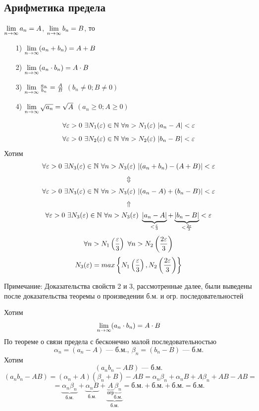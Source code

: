 \subsection{Арифметика предела}
$ \lim\limits_{n \to \infty}a_n = A $, $ \lim\limits_{n \to \infty}b_n = B $, то

\begin{itemize}
    \item[1)] $\lim\limits_{n \to \infty}(a_n + b_n) = A + B$
    \item[2)] $\lim\limits_{n \to \infty}(a_n \cdot b_n) = A \cdot B$
    \item[3)] $\lim\limits_{n \to \infty}\frac{a_n}{b_n} = \frac{A}{B}$ $(b_n \neq 0; B \neq 0)$
    \item[4)] $\lim\limits_{n \to \infty}\sqrt{a_n} = \sqrt{A}$ $(a_n \geq 0; A \geq 0)$
\end{itemize}

\begin{Proof}
    $$ \forall \varepsilon > 0\ \exists N_1(\varepsilon) \in \mathbb{N}\ \forall n > N_1(\varepsilon)\ |a_n - A| < \varepsilon $$
    $$ \forall \eps > 0\ \exists N_2(\eps) \in \N\ \forall n > N_2(\eps)\ |b_n - B| < \eps $$
    Хотим
    $$ \forall \eps > 0\ \exists N_3(\eps) \in \N\ \forall n > N_3(\eps)\ |(a_n + b_n) - (A + B)| < \eps $$
    $$\Updownarrow$$
    $$ \forall \varepsilon > 0\ \exists N_3(\varepsilon) \in \mathbb{N}\ \forall n > N_3(\varepsilon)\ |(a_n - A) + (b_n - B)| < \varepsilon $$
    $$\Uparrow$$
    $$ \forall \varepsilon > 0\ \exists N_3(\varepsilon) \in \mathbb{N}\ \forall n > N_3(\varepsilon)\ \underbrace{|a_n - A|}_{< \frac{\varepsilon}{3}} + \underbrace{|b_n - B|}_{< \frac{2\varepsilon}{3}} < \varepsilon $$
    $$ \forall n > N_1\left(\frac{\varepsilon}{3}\right)\ \forall n > N_2\left(\frac{2\varepsilon}{3}\right)$$
    $$ N_3(\varepsilon) = max\left\{N_1\left(\frac{\varepsilon}{3}\right), N_2\left(\frac{2\varepsilon}{3}\right)\right\}$$
\end{Proof}

Примечание: Доказательства свойств 2 и 3, рассмотренные далее, были выведены после доказательства теоремы о произведении б.м. и огр. последовательностей

\begin{Proof}
    Хотим
    $$\lim\limits_{n \to \infty}(a_n \cdot b_n) = A \cdot B$$
    По теореме о связи предела с бесконечно малой последовательностью
    $$ \alpha_n=(a_n - A) \text{ --- б.м.} ,\ \beta_n=(b_n - B) \text{ --- б.м.} $$
    Хотим
    $$ (a_n b_n - AB) \text{~--- б.м.} $$
    $$ (a_n b_n - AB) = (\alpha_n + A)(\beta_n + B) - AB = \alpha_n\beta_n + \alpha_nB + A\beta_n + AB - AB = $$
    $$ =\underbrace{\alpha_n\beta_n}_{\text{б.м.}} + \underbrace{\alpha_nB}_{\text{б.м.}} + \underbrace{\underbrace{A}_{\text{огр}}\underbrace{\beta_n}_{\text{б.м.}}}_{\text{б.м.}} = \text{б.м.} + \text{б.м.} + \text{б.м.} = \text{б.м.}$$
\end{Proof}

